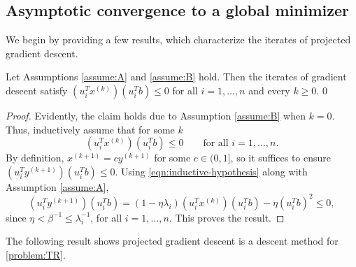 \documentclass[11pt]{article}
\begin{document}
\subsection{Asymptotic convergence to a global minimizer}
We begin by providing a few results, which characterize
the iterates of projected gradient descent.
\begin{lem} 
\label{lem:signs}
Let Assumptions \ref{assume:A} and 
\ref{assume:B} hold. Then the iterates of 
gradient descent satisfy 
$(u_i^Tx^{(k)})(u_i^Tb)\leq 0$ for all $i = 1, \dots, n$ and every $k \geq 0$. 
0\end{lem}
\begin{proof}
  Evidently, the claim holds due to Assumption \ref{assume:B} when $k = 0$. Thus, inductively assume that
  for some $k$
  \begin{equation}\label{eqn:inductive-hypothesis}
  (u_i^Tx^{(k)})(u_i^Tb)\leq 0 \qquad  \text{for all $i = 1, \dots, n$.}
  \end{equation}
  By definition, $x^{(k + 1)} = c y^{(k + 1)}$ for some $c \in (0 , 1]$, so it suffices to ensure
    $(u_i^Ty^{(k + 1)})(u_i^Tb) \leq 0$.
  Using \eqref{eqn:inductive-hypothesis} along with Assumption \ref{assume:A},
    \[
    (u_i^Ty^{(k + 1)})(u_i^Tb) = (1 - \eta \lambda_i) (u_i^Tx^{(k)})(u_i^Tb) - \eta (u_i^Tb)^2 \leq 0,
    \]
    since $\eta < \beta^{-1} \leq \lambda_i^{-1}$,
    for all $i =1 ,\dots, n$. This proves the result.  
\end{proof}
The following result shows projected gradient descent is a descent method for \eqref{problem:TR}.
\end{document}
